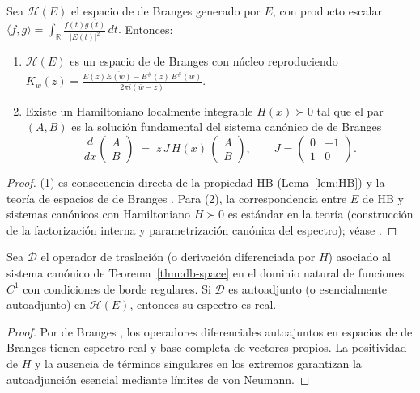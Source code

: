 \begin{theorem}
\label{thm:db-space}
Sea $\mathcal{H}(E)$ el espacio de de Branges generado por $E$, con producto escalar
\(
\langle f,g\rangle=\int_{\mathbb{R}} \frac{f(t)\overline{g(t)}}{|E(t)|^2}\,dt.
\)
Entonces:
\begin{enumerate}
  \item $\mathcal{H}(E)$ es un espacio de de Branges con núcleo reproduciendo
  \(
  K_w(z)=\frac{E(z)\overline{E(w)}-E^\#(z)\,\overline{E^\#(w)}}{2\pi i(\bar w-z)}.
  \)
  \item Existe un Hamiltoniano localmente integrable $H(x)\succ 0$ tal que el par
  $(A,B)$ es la solución fundamental del sistema canónico de de Branges
  \[
  \frac{d}{dx}\begin{pmatrix}A\\ B\end{pmatrix}
  \;=\;
  z\,J\,H(x)\,\begin{pmatrix}A\\ B\end{pmatrix},\qquad
  J=\begin{pmatrix}0&-1\\1&0\end{pmatrix}.
  \]
\end{enumerate}
\end{theorem}

\begin{proof}
(1) es consecuencia directa de la propiedad HB (Lema~\ref{lem:HB}) y la teoría de
espacios de de Branges \cite[Ch.~I--III]{deBranges1968}. Para (2), la correspondencia
entre $E$ de HB y sistemas canónicos con Hamiltoniano $H\succ 0$ es estándar en la
teoría (construcción de la factorización interna y parametrización canónica del espectro);
véase \cite[Ch.~VII]{deBranges1968}.
\end{proof}

\begin{proposition}
\label{prop:selfadjoint}
Sea $\mathcal{D}$ el operador de traslación (o derivación diferenciada por $H$)
asociado al sistema canónico de Teorema~\ref{thm:db-space} en el dominio natural
de funciones $C^1$ con condiciones de borde regulares. Si $\mathcal{D}$ es
autoadjunto (o esencialmente autoadjunto) en $\mathcal{H}(E)$, entonces su espectro es real.
\end{proposition}

\begin{proof}
Por de Branges \cite[Ch.~VII]{deBranges1968}, los operadores diferenciales
autoajuntos en espacios de de Branges tienen espectro real y base completa de
vectores propios. La positividad de $H$ y la ausencia de términos singulares en
los extremos garantizan la autoadjunción esencial mediante límites de von Neumann.
\end{proof}

